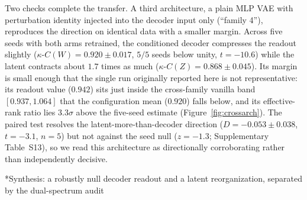 \documentclass[11pt,a4paper]{article}
\makeatletter
\renewcommand{\subsection}{\@startsection{subsection}{2}{0pt}{10pt plus 4pt}{4pt}{\normalsize\bfseries}}
\makeatother
\begin{document}
Two checks complete the transfer. A third architecture, a plain MLP VAE with perturbation identity injected into the decoder input only (``family 4''), reproduces the direction on identical data with a smaller margin. Across five seeds with both arms retrained, the conditioned decoder compresses the readout slightly ($\kappa$-$C(W)=0.920\pm0.017$, $5/5$ seeds below unity, $t=-10.6$) while the latent contracts about $1.7$ times as much ($\kappa$-$C(Z)=0.868\pm0.045$). Its margin is small enough that the single run originally reported here is not representative: its readout value ($0.942$) sits just inside the cross-family vanilla band $[0.937,1.064]$ that the configuration mean ($0.920$) falls below, and its effective-rank ratio lies $3.3\sigma$ above the five-seed estimate (Figure~\ref{fig:crossarch}). The paired test resolves the latent-more-than-decoder direction ($D=-0.053\pm0.038$, $t=-3.1$, $n=5$) but not against the seed null ($z=-1.3$; Supplementary Table~S13), so we read this architecture as directionally corroborating rather than independently decisive.

\subsection*{Synthesis: a robustly null decoder readout and a latent reorganization, separated by the dual-spectrum audit}
\end{document}
